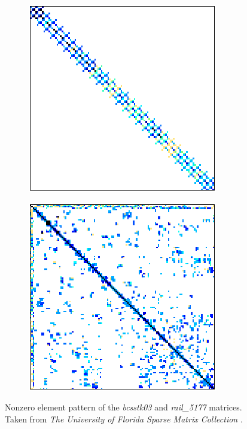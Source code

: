 \begin{figure}[ht!]
	\centering
	\begin{subfigure}{.5\textwidth}
		\centering
		\includegraphics[width=.7\textwidth, keepaspectratio, clip]{Images/ch3/matrices/bcsstk03.png}
		\label{Subfigure:comparing-decomposition-implementations-speedup-comparison-between-CM-and-different-ICMs-of-the-implementations-matrix-bcsstk03}
	\end{subfigure}%
	\begin{subfigure}{.5\textwidth}
		\centering
		\includegraphics[width=.7\textwidth, keepaspectratio, clip]{images/ch3/matrices/rail_5177.png}
		\label{Subfigure:comparing-decomposition-implementations-speedup-comparison-between-CM-and-different-ICMs-matrix-rail_5177}
	\end{subfigure}
	\caption{Nonzero element pattern of the \textit{bcsstk03} and \textit{rail\_5177} matrices. Taken from \emph{The University of Florida Sparse Matrix Collection} \cite{Davis2011}.}
	\label{Figure:comparing-decomposition-implementations-speedup-comparison-between-CM-and-different-ICMs-matrices-rail_5177-bcsstk03}
\end{figure}

